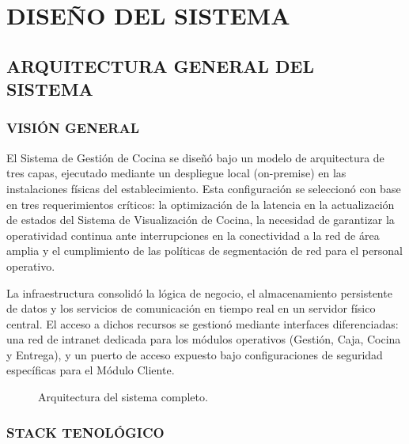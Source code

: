 \chapter{DISEÑO DEL SISTEMA}
\section{ARQUITECTURA GENERAL DEL SISTEMA}
\subsection{VISIÓN GENERAL}
El Sistema de Gestión de Cocina se diseñó bajo un modelo de arquitectura de tres capas, ejecutado mediante un despliegue local (on-premise) en las instalaciones físicas del establecimiento. Esta configuración se seleccionó con base en tres requerimientos críticos: la optimización de la latencia en la actualización de estados del Sistema de Visualización de Cocina, la necesidad de garantizar la operatividad continua ante interrupciones en la conectividad a la red de área amplia y el cumplimiento de las políticas de segmentación de red para el personal operativo. 

La infraestructura consolidó la lógica de negocio, el almacenamiento persistente de datos y los servicios de comunicación en tiempo real en un servidor físico central. El acceso a dichos recursos se gestionó mediante interfaces diferenciadas: una red de intranet dedicada para los módulos operativos (Gestión, Caja, Cocina y Entrega), y un puerto de acceso expuesto bajo configuraciones de seguridad específicas para el Módulo Cliente.
\begin{figure}[H]
    \centering
    
    \caption{Arquitectura del sistema completo.}
    \label{fig:arquitectura_sistema_completo}
\end{figure}

\subsection{STACK TENOLÓGICO}
\begingroup
\setlength{\LTleft}{\fill}
\setlength{\LTright}{\fill}

